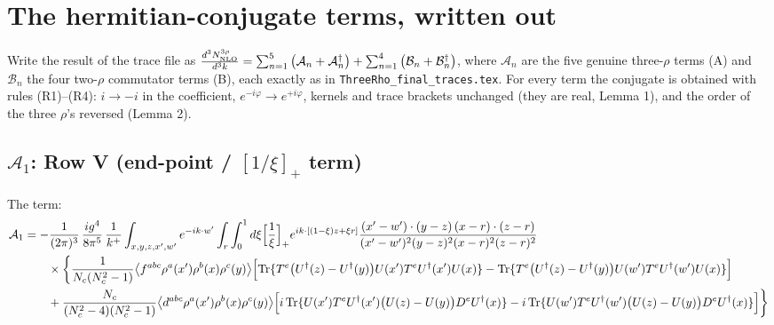 \documentclass[10pt]{article}
\begin{document}
\section{The hermitian-conjugate terms, written out}
Write the result of the trace file as $\frac{d^{3}N^{3\rho}_{\rm NLO}}{d^{3}k}=\sum_{n=1}^{5}\big(\mathcal{A}_{n}+\mathcal{A}_{n}^{\dagger}\big)+\sum_{n=1}^{4}\big(\mathcal{B}_{n}+\mathcal{B}_{n}^{\dagger}\big)$, where $\mathcal{A}_{n}$ are the five genuine three-$\rho$ terms (A) and $\mathcal{B}_{n}$ the four two-$\rho$ commutator terms (B), each exactly as in \texttt{ThreeRho\_final\_traces.tex}. For every term the conjugate is obtained with rules (R1)--(R4): $i\to-i$ in the coefficient, $e^{-i\varphi}\to e^{+i\varphi}$, kernels and trace brackets unchanged (they are real, Lemma 1), and the order of the three $\rho$'s reversed (Lemma 2).
\subsection*{$\mathcal{A}_{1}$: Row V (end-point / $[1/\xi]_{+}$ term)}
\noindent The term:
\begin{align}
\mathcal{A}_{1}&=-\frac{1}{(2\pi)^{3}}\,\frac{ig^{4}}{8\pi^{5}}\,\frac{1}{k^{+}}\int_{x,y,z,x',w'}e^{-ik\cdot w'}\int_{r}\int_{0}^{1}d\xi\Big[\frac1\xi\Big]_{+}e^{ik\cdot[(1-\xi)z+\xi r]}\frac{(x'-w')\cdot(y-z)\,(x-r)\cdot(z-r)}{(x'-w')^{2}(y-z)^{2}(x-r)^{2}(z-r)^{2}}\notag\\
&\qquad\times\bigg\{\frac{1}{N_{c}(N_{c}^{2}-1)}\big\langle f^{abc}\rho^{a}(x')\rho^{b}(x)\rho^{c}(y)\big\rangle\Big[{\rm Tr}\{T^{e}\big(U^{\dagger}(z)-U^{\dagger}(y)\big)U(x')T^{e}U^{\dagger}(x')U(x)\}-{\rm Tr}\{T^{e}\big(U^{\dagger}(z)-U^{\dagger}(y)\big)U(w')T^{e}U^{\dagger}(w')U(x)\}\Big]\notag\\&\qquad+\frac{N_{c}}{(N_{c}^{2}-4)(N_{c}^{2}-1)}\big\langle d^{abc}\rho^{a}(x')\rho^{b}(x)\rho^{c}(y)\big\rangle\Big[i\,{\rm Tr}\{U(x')T^{e}U^{\dagger}(x')\big(U(z)-U(y)\big)D^{e}U^{\dagger}(x)\}-i\,{\rm Tr}\{U(w')T^{e}U^{\dagger}(w')\big(U(z)-U(y)\big)D^{e}U^{\dagger}(x)\}\Big]\bigg\}\notag\\[6pt]
\end{align}
\end{document}
